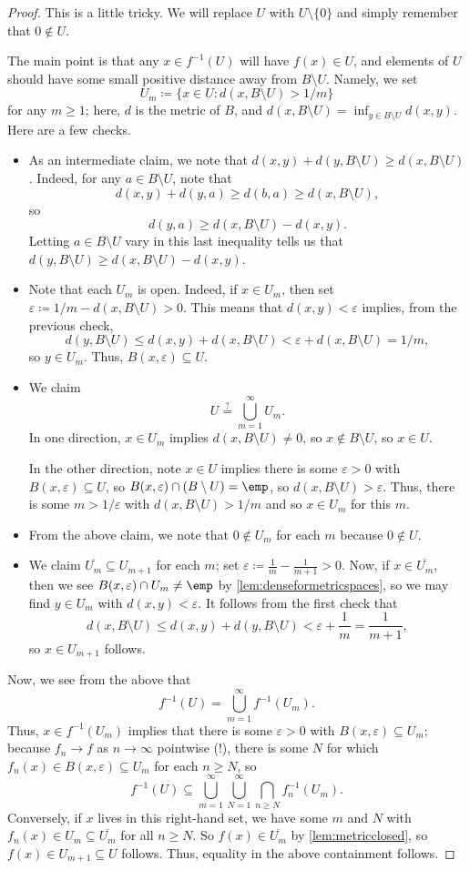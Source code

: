 \documentclass[../notes.tex]{subfiles}
\begin{document}
\begin{proof}
	This is a little tricky. We will replace $U$ with $U\setminus\{0\}$ and simply remember that $0\notin U$.
	
	The main point is that any $x\in f^{-1}(U)$ will have $f(x)\in U$, and elements of $U$ should have some small positive distance away from $B\setminus U$. Namely, we set
	\[U_m\coloneqq\{x\in U:d(x,B\setminus U)>1/m\}\]
	for any $m\ge1$; here, $d$ is the metric of $B$, and $d(x,B\setminus U)=\inf_{y\in B\setminus U}d(x,y)$. Here are a few checks.
	\begin{itemize}
		\item As an intermediate claim, we note that $d(x,y)+d(y,B\setminus U)\ge d(x,B\setminus U)$. Indeed, for any $a\in B\setminus U$, note that
		\[d(x,y)+d(y,a)\ge d(b,a)\ge d(x,B\setminus U),\]
		so
		\[d(y,a)\ge d(x,B\setminus U)-d(x,y).\]
		Letting $a\in B\setminus U$ vary in this last inequality tells us that $d(y,B\setminus U)\ge d(x,B\setminus U)-d(x,y)$.
		\item Note that each $U_m$ is open. Indeed, if $x\in U_m$, then set $\varepsilon\coloneqq 1/m-d(x,B\setminus U)>0$. This means that $d(x,y)<\varepsilon$ implies, from the previous check,
		\[d(y,B\setminus U)\le d(x,y)+d(x,B\setminus U)<\varepsilon+d(x,B\setminus U)=1/m,\]
		so $y\in U_m$. Thus, $B(x,\varepsilon)\subseteq U$.
		\item We claim
		\[U\stackrel?=\bigcup_{m=1}^\infty U_m.\]
		In one direction, $x\in U_m$ implies $d(x,B\setminus U)\ne0$, so $x\notin B\setminus U$, so $x\in U$.
		
		In the other direction, note $x\in U$ implies there is some $\varepsilon>0$ with $B(x,\varepsilon)\subseteq U$, so $B(x,\varepsilon)\cap(B\setminus U)=\emp$, so $d(x,B\setminus U)>\varepsilon$. Thus, there is some $m>1/\varepsilon$ with $d(x,B\setminus U)>1/m$ and so $x\in U_m$ for this $m$.
		\item From the above claim, we note that $0\notin U_m$ for each $m$ because $0\notin U$.
		\item We claim $\overline{U_m}\subseteq U_{m+1}$ for each $m$; set $\varepsilon\coloneqq\frac1m-\frac1{m+1}>0$. Now, if $x\in\overline{U_m}$, then we see $B(x,\varepsilon)\cap U_m\ne\emp$ by \autoref{lem:denseformetricspaces}, so we may find $y\in U_m$ with $d(x,y)<\varepsilon$. It follows from the first check that
		\[d(x,B\setminus U)\le d(x,y)+d(y,B\setminus U)<\varepsilon+\frac1m=\frac1{m+1},\]
		so $x\in U_{m+1}$ follows.
	\end{itemize}
	Now, we see from the above that
	\[f^{-1}(U)=\bigcup_{m=1}^\infty f^{-1}(U_m).\]
	Thus, $x\in f^{-1}(U_m)$ implies that there is some $\varepsilon>0$ with $B(x,\varepsilon)\subseteq U_m$; because $f_n\to f$ as $n\to\infty$ pointwise (!), there is some $N$ for which $f_n(x)\in B(x,\varepsilon)\subseteq U_m$ for each $n\ge N$, so
	\[f^{-1}(U)\subseteq\bigcup_{m=1}^\infty\bigcup_{N=1}^\infty\bigcap_{n\ge N}f_n^{-1}(U_m).\]
	Conversely, if $x$ lives in this right-hand set, we have some $m$ and $N$ with $f_n(x)\in U_m\subseteq\overline{U_m}$ for all $n\ge N$. So $f(x)\in\overline{U_m}$ by \autoref{lem:metricclosed}, so $f(x)\in U_{m+1}\subseteq U$ follows. Thus, equality in the above containment follows.


\end{proof}
\end{document}
